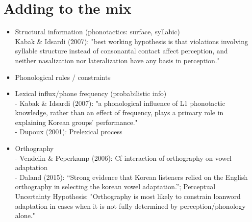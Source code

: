 \section{Adding to the mix}  
 
\begin{itemize}
\item Structural information (phonotactics: surface, syllabic) \\
  Kabak \& Idsardi (2007): "best working hypothesis is that violations involving syllable structure instead of consonantal contact affect perception, and neither nasalization nor lateralization have any basis in perception."
  \item Phonological rules / constraints
  \item Lexical influx/phone frequency (probabilistic info) \\
    - Kabak \& Idsardi (2007): "a phonological influence of L1 phonotactic knowledge, rather than an effect of frequency, plays a primary role in explaining Korean groups’ performance." \\
    - Dupoux (2001): Prelexical process 

  \item Orthography \\
    - Vendelin \& Peperkamp (2006): Cf interaction of orthography on vowel adaptation \\ 
    - Daland (2015): ``Strong evidence that Korean listeners relied on the English orthography in selecting the korean vowel adaptation.''; Perceptual Uncertainty Hypothesis: "Orthography is most likely to constrain loanword adaptation in cases when it is not fully determined by perception/phonology alone."
    
\end{itemize}

